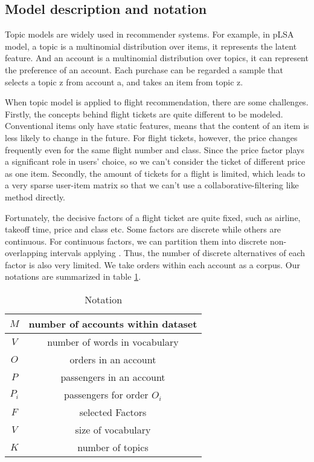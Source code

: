 \documentclass{llncs}
\begin{document}
\subsection{Model description and notation}
Topic models are widely used in recommender systems. For example, in pLSA model\cite{tomas:coll}, a topic is a multinomial distribution over items, it represents the latent feature. And an account is a multinomial distribution over topics, it can represent the preference of an account. Each purchase can be regarded a sample that selects a topic z from account a, and takes an item from topic z.\par
When topic model is applied to flight recommendation, there are some challenges. Firstly, the concepts behind flight tickets are quite different to be modeled. Conventional items only have static features, means that the content of an item is less likely to change in the future. For flight tickets, however, the price changes frequently even for the same flight number and class. Since the price factor plays a significant role in users' choice, so we can't consider the ticket of different price as one item. Secondly, the amount of tickets for a flight is limited, which leads to a very sparse user-item matrix so that we can't use a collaborative-filtering like method directly.\par
Fortunately, the decisive factors of a flight ticket are quite fixed, such as airline, takeoff time, price and class etc. Some factors are discrete while others are continuous. For continuous factors, we can partition them into discrete non-overlapping intervals applying . Thus, the number of discrete alternatives of each factor is also very limited. We take orders within each account as a corpus. Our notations are summarized in table \ref{tab:not}.\par
\begin{table}[!htbp]
\centering
\caption{\label{tab:not}Notation}
\begin{tabular}{|c|c|} \hline
$M$ & number of accounts within dataset\\ \hline
$V$ & number of words in vocabulary\\ \hline
$O$ & orders in an account\\ \hline
$P$ & passengers in an account\\ \hline
$P_i$ & passengers for order $O_i$ \\ \hline
$F$ & selected Factors\\ \hline
$V$ & size of vocabulary\\ \hline
$K$ & number of topics\\ \hline
\end{tabular}
\end{table}
\end{document}

